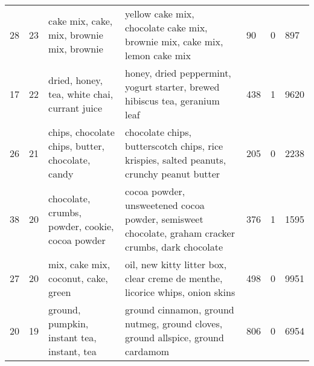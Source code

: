 \begin{tabular}{lllllll}
28 & 23 & cake mix, cake, mix, brownie mix, brownie & yellow cake mix, chocolate cake mix, brownie mix, cake mix, lemon cake mix & 90 & 0 & 897 \\
17 & 22 & dried, honey, tea, white chai, currant juice & honey, dried peppermint, yogurt starter, brewed hibiscus tea, geranium leaf & 438 & 1 & 9620 \\
26 & 21 & chips, chocolate chips, butter, chocolate, candy & chocolate chips, butterscotch chips, rice krispies, salted peanuts, crunchy peanut butter & 205 & 0 & 2238 \\
38 & 20 & chocolate, crumbs, powder, cookie, cocoa powder & cocoa powder, unsweetened cocoa powder, semisweet chocolate, graham cracker crumbs, dark chocolate & 376 & 1 & 1595 \\
27 & 20 & mix, cake mix, coconut, cake, green & oil, new kitty litter box, clear creme de menthe, licorice whips, onion skins & 498 & 0 & 9951 \\
20 & 19 & ground, pumpkin, instant tea, instant, tea & ground cinnamon, ground nutmeg, ground cloves, ground allspice, ground cardamom & 806 & 0 & 6954 \\
\bottomrule
\end{tabular}
